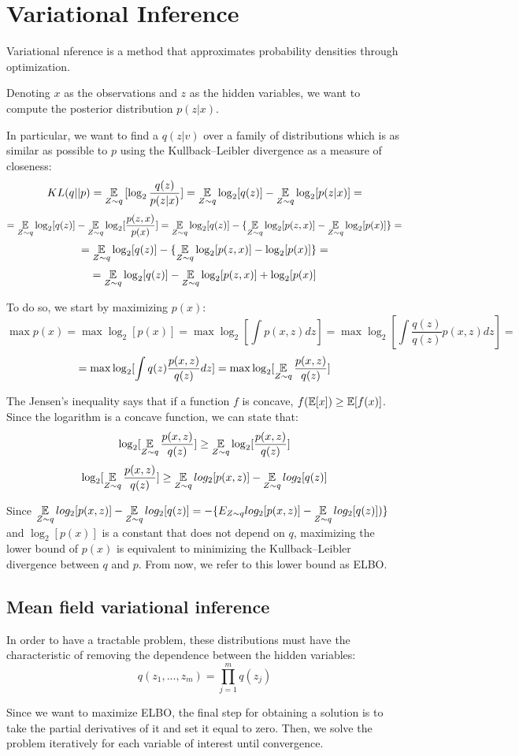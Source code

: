 \chapter{Variational Inference} \label{vi}
Variational nference is a method that approximates probability densities through optimization.

Denoting $x$ as the observations and $z$ as the hidden variables,
we want to compute the posterior distribution $p(z | x)$.

In particular, we want to find a $q(z | v)$ over a family of distributions which is as similar
as possible to $p$ using the Kullback–Leibler divergence as a measure of closeness:
$$ KL(q || p) = \operatorname*{\mathbb{E}}_{Z \sim q} {[\log_2 \frac{q(z)}{p(z | x)}]} = \operatorname*{\mathbb{E}}_{Z \sim q} \log_2 [q(z)] - \operatorname*{\mathbb{E}}_{Z \sim q} \log_2 [p(z | x)] = $$
$$ = \operatorname*{\mathbb{E}}_{Z \sim q} \log_2 [q(z)] - \operatorname*{\mathbb{E}}_{Z \sim q} \log_2 [\frac{p(z,x)}{p(x)}] = \operatorname*{\mathbb{E}}_{Z \sim q} \log_2 [q(z)] - \{ \operatorname*{\mathbb{E}}_{Z \sim q} \log_2 [p(z,x)] - \operatorname*{\mathbb{E}}_{Z \sim q} \log_2 [p(x)] \} = $$
$$ = \operatorname*{\mathbb{E}}_{Z \sim q} \log_2 [q(z)] - \{ \operatorname*{\mathbb{E}}_{Z \sim q} \log_2 [p(z,x)] - \log_2 [p(x)] \} = $$
$$ = \operatorname*{\mathbb{E}}_{Z \sim q} \log_2 [q(z)] - \operatorname*{\mathbb{E}}_{Z \sim q} \log_2 [p(z,x)] + \log_2 [p(x)] $$


To do so, we start by maximizing $p(x)$:
$$
    \displaystyle \max p(x) = \max \log_2[p(x)]
    = \max \log_2[\int p(x,z) dz]
    = \max \log_2[\int \frac{q(z)}{q(z)} p(x,z) dz] =
$$
$$
    = \max \log_2[\int q(z) \frac{p(x,z)}{q(z)} dz]
    = \max \log_2[\operatorname*{\mathbb{E}}_{Z \sim q} \frac{p(x,z)}{q(z)}]
$$

The Jensen's inequality says that if a function $f$ is concave, $f(\operatorname*{\mathbb{E}}[x]) \geq \operatorname*{\mathbb{E}}[f(x)]$.
Since the logarithm is a concave function, we can state that:
$$ \log_2[\operatorname*{\mathbb{E}}_{Z \sim q} \frac{p(x,z)}{q(z)}] \geq \operatorname*{\mathbb{E}}_{Z \sim q} \log_2[\frac{p(x,z)}{q(z)}] $$
$$ \log_2[\operatorname*{\mathbb{E}}_{Z \sim q} \frac{p(x,z)}{q(z)}] \geq \operatorname*{\mathbb{E}}_{Z \sim q} log_2[p(x,z)] - \operatorname*{\mathbb{E}}_{Z \sim q} log_2[q(z)] $$

Since $ \displaystyle \operatorname*{\mathbb{E}}_{Z \sim q} log_2[p(x,z)] - \operatorname*{\mathbb{E}}_{Z \sim q} log_2[q(z)] = -\{E_{Z \sim q} log_2[p(x,z)] - \operatorname*{\mathbb{E}}_{Z \sim q} log_2[q(z)])\}$
and $\log_2[p(x)]$ is a constant that does not depend on $q$,
maximizing the lower bound of $p(x)$ is equivalent to minimizing the Kullback–Leibler divergence between $q$ and $p$.
From now, we refer to this lower bound as ELBO.

\section{Mean field variational inference}
In order to have a tractable problem, these distributions must have the characteristic
of removing the dependence between the hidden variables:
$$ q(z_1, ..., z_m) = \prod_{j=1}^m q(z_j) $$

Since we want to maximize ELBO,
the final step for obtaining a solution is to take the partial derivatives of it and set it equal to zero.
Then, we solve the problem iteratively for each variable of interest until convergence.